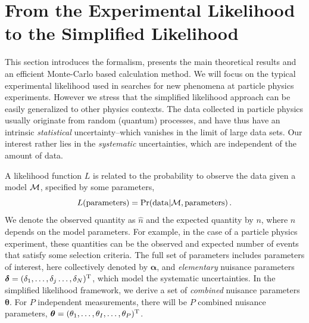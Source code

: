\documentclass[11pt]{article}
\newcommand{\be}{\begin{equation}}
\newcommand{\ee}{\end{equation}}
\begin{document}
\section{From the Experimental Likelihood to the Simplified Likelihood}
\label{se:EL_SL}

This section introduces the formalism, presents the main theoretical results and an efficient Monte-Carlo based calculation method. We will focus on the typical experimental likelihood used in searches for new phenomena at particle physics experiments. However we stress that the simplified likelihood approach can be easily generalized to other physics contexts.
The data collected in particle physics usually originate from random (quantum) processes, and have thus have an intrinsic \textit{statistical} uncertainty--which vanishes in the limit of large data sets. Our interest rather lies in the \textit{systematic} uncertainties, which are independent of the amount of data.


A likelihood function $L$ is related to the probability to observe the data given a model $\cal M$, specified by some parameters,
\be L({\rm parameters})={\rm Pr}({\rm data}|{\cal M},{\rm parameters})\,.\ee
We denote the observed  quantity as $\hat{n}$ and the expected quantity by $n$, where $n$ depends on the model parameters.   For example, in the case of
a particle physics experiment, these quantities can be the observed and expected number of events that satisfy some selection criteria.
The full set of parameters includes parameters of interest, here collectively denoted by $\bm{\alpha}$, and \textit{elementary} nuisance parameters $\bm{\delta}=(\delta_1,\ldots,\delta_{j}\ldots,\delta_N)^{\rm{T}}$, which model the systematic uncertainties.
In the simplified likelihood framework, we derive a set of \textit{combined} nuisance parameters $\bm{\theta}$. For $P$ independent measurements, there will be $P$ combined nuisance parameters, $\bm{\theta}=(\theta_1,\ldots,\theta_{I},\ldots,\theta_P)^{\rm{T}}$.
\end{document}
